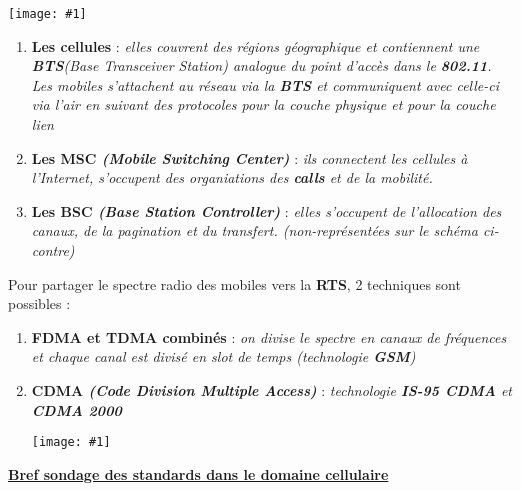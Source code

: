 \documentclass{article}
\newcommand{\imgR}[2]{\begin{center}\texttt{[image: \#1]}\end{center}}
\newcommand{\bfp}[2]{\item \textbf{#1} : \textit{#2}}
\newcommand{\stitre}[1]{\noindent\textbf{\underline{#1}} \\}
\begin{document}
\begin{multicols}{2}
\imgR{CN_160.png}{250}
\begin{enumerate}
\bfp{Les cellules}{elles couvrent des régions géographique et contiennent une \textbf{BTS}\textit{(Base 
Transceiver Station)} analogue du point d'accès dans le \textbf{802.11}. Les mobiles s'attachent au réseau via 
la \textbf{BTS} et communiquent avec celle-ci via l'air en suivant des protocoles pour la couche physique et pour 
la couche lien}
\bfp{Les MSC \textit{(Mobile Switching Center)}}{ils connectent les cellules à l'Internet, s'occupent des 
organiations des \textbf{calls} et de la mobilité.}
\bfp{Les BSC \textit{(Base Station Controller)}}{elles s'occupent de l'allocation des canaux, de la pagination et 
du transfert. (non-représentées sur le schéma ci-contre)}
\end{enumerate}
\end{multicols}

\newpage

\begin{multicols}{2}
\noindent Pour partager le spectre radio des mobiles vers la \textbf{RTS}, 2 techniques sont possibles : 
\begin{enumerate}
\bfp{FDMA et TDMA combinés}{on divise le spectre en canaux de fréquences et chaque canal est divisé en slot de 
temps (technologie \textbf{GSM})}
\bfp{CDMA \textit{(Code Division Multiple Access)}}{technologie \textbf{IS-95 CDMA} et \textbf{CDMA 2000}}
\imgR{CN_161.png}{250}
\end{enumerate}
\end{multicols}

\stitre{Bref sondage des standards dans le domaine cellulaire}
\end{document}

